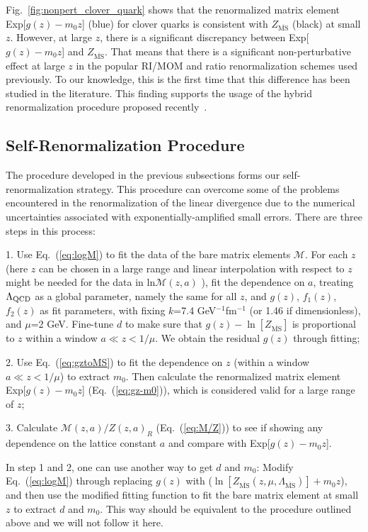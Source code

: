Fig.~\ref{fig:nonpert_clover_quark} shows that the renormalized matrix element Exp[$g(z)-m_{0}z$] (blue) for clover quarks is consistent with $Z_{\overline{\mathrm{MS}}}$ (black) at small $z$. However, at large $z$, there is a significant discrepancy between Exp[$g(z)-m_{0}z$] and $Z_{\overline{\mathrm{MS}}}$. That means that there is a significant non-perturbative effect at large $z$ in the popular RI/MOM and ratio renormalization schemes used previously.
To our knowledge, this is the first time that this difference has been studied 
in the literature. This finding supports the usage of the hybrid renormalization procedure proposed recently~\cite{Ji:2020brr}.

\subsection{Self-Renormalization Procedure}\label{sec:reofpro}

The procedure developed in the previous subsections 
forms our self-renormalization strategy. This procedure can overcome
some of the problems encountered in the renormalization
of the linear divergence due to the numerical uncertainties associated
with exponentially-amplified small errors. 
There are three steps in this process:

1. Use Eq.~(\ref{eq:logM}) to fit the data of the bare matrix elements $\mathcal{M}$. For each $z$ (here $z$ can be chosen in a large range and linear interpolation with respect to $z$ might be needed 
for the data in ln$\mathcal{M}(z,a)$ ), fit the dependence on $a$, treating $\Lambda_{\rm QCD}$ as a global parameter, namely the same for all $z$, and $g(z)$, $f_{1}(z)$, $f_{2}(z)$ as fit parameters, with fixing $k$=7.4 GeV$^{-1}$fm$^{-1}$ (or 1.46 if dimensionless), and $\mu$=2 GeV. Fine-tune $d$ to make sure that $g(z) - \ln[Z_{\overline{\mathrm{MS}}}]$ is proportional to $z$ within a window $a \ll z < 1/\mu$. We obtain the residual $g(z)$ through fitting;

2. Use Eq.~(\ref{eq:gztoMS}) to fit the dependence on $z$ (within a window $a \ll  z < 1/\mu$) to extract $m_{0}$. Then calculate the renormalized matrix element Exp[$g(z)-m_{0}z$] (Eq.~(\ref{eq:gz-m0})), which is considered valid for a large range of $z$;

3. Calculate $\mathcal{M}(z,a)/Z(z,a)_{R}$ (Eq.~(\ref{eq:M/Z})) to see if showing any dependence on the lattice constant $a$ and compare with Exp[$g(z)-m_{0}z$]. 

In step 1 and 2, one can use another way to get $d$ and $m_{0}$: Modify Eq.~(\ref{eq:logM}) through replacing $g(z)$ with ($\ln[Z_{\overline{\mathrm{MS}}}(z,\mu, \Lambda_{\overline{\mathrm{MS}}})] + m_{0} z$), and then use the modified fitting function to fit the bare matrix element at small $z$ to extract $d$ and $m_{0}$. This way should be equivalent to the procedure outlined above and we will not follow it here.

